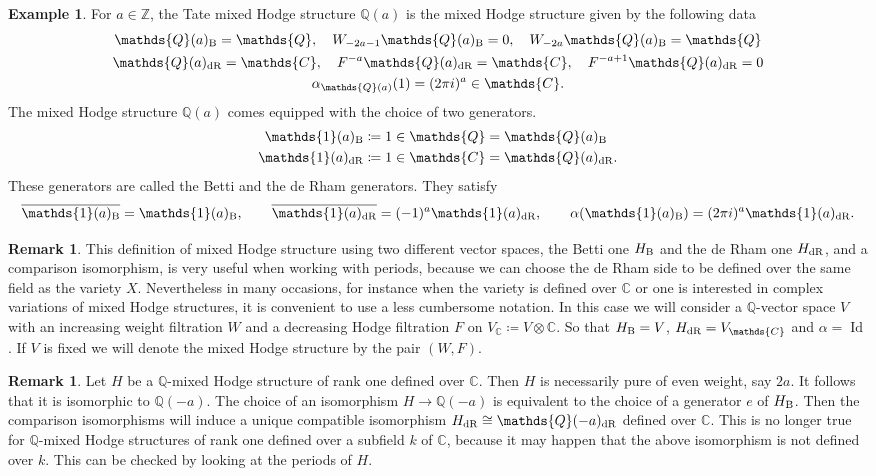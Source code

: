 \documentclass[11pt,a4paper]{amsart}
\newcommand{\Betti}{\text{\rm B}}
\newcommand{\dR}{\text{\rm dR}}
\newcommand{\C}{\mathds{C}}
\newcommand{\Q}{\mathds{Q}}
\newcommand{\Z}{\mathds{Z}}
\newcommand{\bfone}{{\mathds{1}}}
\DeclareMathOperator{\Id}{Id}
\numberwithin{equation}{section}
\theoremstyle{plain}
\theoremstyle{definition}
\newtheorem{rmk}[prop]{Remark}
\newtheorem{ex}[prop]{Example}
\begin{document}
\begin{ex}\label{exm:3}
  For $a\in \Z$, the Tate mixed Hodge structure $\Q(a)$ is the mixed
  Hodge structure given by the following data
  \begin{gather*}
    \Q(a)_{\Betti}=\Q,\quad W_{-2a-1}\Q(a)_{\Betti}=0,\quad
    W_{-2a}\Q(a)_{\Betti}=\Q\\
    \Q(a)_{\dR}=\C,\quad F^{-a}\Q(a)_{\dR}=\C,\quad
    F^{-a+1}\Q(a)_{\dR}=0\\
    \alpha _{\Q(a)}(1)=(2\pi i)^{a}\in \C.
  \end{gather*}
The mixed Hodge structure $\Q(a)$ comes equipped with the
choice of two
generators.
\begin{align*}
  \bfone(a)_{\Betti} &\coloneqq 1\in \Q=\Q(a)_{\Betti}\\
  \bfone(a)_{\dR} &\coloneqq 1\in \C=\Q(a)_{\dR}.
\end{align*}
These generators are called the Betti and the de Rham generators. They
satisfy
\begin{displaymath}
  \overline {\bfone(a)_{\Betti}}=\bfone(a)_{\Betti},\qquad
  \overline {\bfone(a)_{\dR}}=(-1)^{a}\bfone(a)_{\dR},\qquad
  \alpha(\bfone(a)_{\Betti})=(2\pi i)^{a}\bfone(a)_{\dR}.
\end{displaymath}
\end{ex}
\begin{rmk}\label{rem:7} This definition of mixed Hodge structure using two
  different vector spaces, the Betti one $H_{\Betti}$ and the de Rham one
  $H_{\dR}$, and a comparison isomorphism, is very useful when working
  with periods, because we can choose the de Rham side to be defined
  over the same field as the variety $X$. Nevertheless in many
  occasions, for instance when the variety is defined over $\C$ or one
  is interested in complex variations of mixed Hodge structures,  
  it is convenient to use a less cumbersome notation. In this case we
  will consider a $\Q$-vector space $V$ with an increasing weight
  filtration $W$ and a decreasing Hodge filtration $F$ on
  $V_{\C}\coloneqq V\otimes \C$. So that $H_{\Betti}=V$, $H_{\dR}=V_\C$ and
  $\alpha =\Id$. If $V$ is fixed we will denote the mixed Hodge
  structure by the pair $(W,F)$.
\end{rmk}

\begin{rmk}\label{rem:2.2}
  Let $H$ be a $\Q$-mixed Hodge structure of rank one defined over $\C$. Then $H$ is
  necessarily pure of even weight, say $2a$. It follows that it is
  isomorphic to 
  $\Q(-a)$. The choice of an isomorphism $H\to \Q(-a)$ is equivalent to
  the choice of a generator $e$ of $H_{\Betti}$. Then the comparison
  isomorphisms will induce a unique compatible isomorphism
  $H_{\dR}\cong \Q(-a)_{\dR}$ defined over $\C$. 
  This is no longer true
  for $\Q$-mixed Hodge structures of rank one defined over a subfield
  $k$ of $\C$, because it may happen that the above isomorphism is
  not defined over $k$. This can be checked by looking at the periods
  of $H$. 
\end{rmk}
\end{document}
